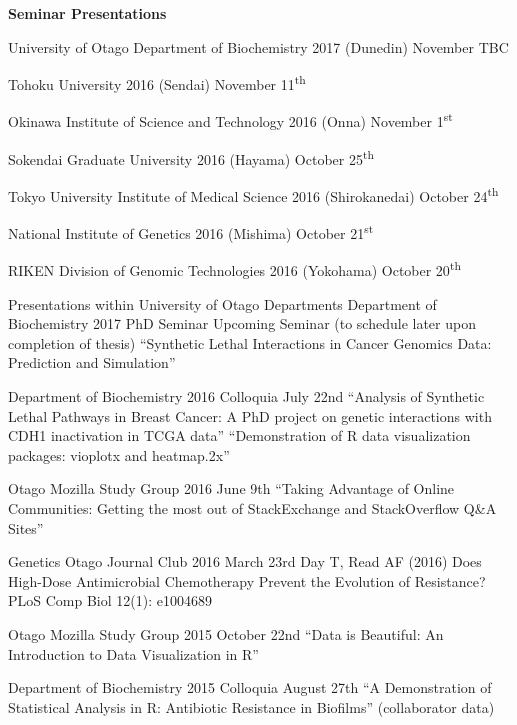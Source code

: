 \clearpage
\textbf{Seminar Presentations}

\begin{small}

University of Otago Department of Biochemistry 2017 (Dunedin) November TBC

Tohoku University 2016 (Sendai) November 11\textsuperscript{th}

Okinawa Institute of Science and Technology 2016 (Onna) November 1\textsuperscript{st}

Sokendai Graduate University 2016 (Hayama) October 25\textsuperscript{th}

Tokyo University Institute of Medical Science 2016 (Shirokanedai) October 24\textsuperscript{th} 

National Institute of Genetics 2016 (Mishima) October 21\textsuperscript{st}

RIKEN Division of Genomic Technologies 2016 (Yokohama) October 20\textsuperscript{th}

\end{small}




\iffalse
Presentations within University of Otago Departments
Department of Biochemistry 2017 PhD Seminar
Upcoming Seminar (to schedule later upon completion of thesis)
``Synthetic Lethal Interactions in Cancer Genomics Data: Prediction and Simulation''

Department of Biochemistry 2016 Colloquia July 22nd
``Analysis of Synthetic Lethal Pathways in Breast Cancer: A PhD project on genetic interactions with CDH1 inactivation in TCGA data''
``Demonstration of R data visualization packages: vioplotx and heatmap.2x''

Otago Mozilla Study Group 2016 June 9th
``Taking Advantage of Online Communities: Getting the most out of StackExchange and StackOverflow Q&A Sites''

Genetics Otago Journal Club 2016 March 23rd 
Day T, Read AF (2016) Does High-Dose Antimicrobial Chemotherapy Prevent the Evolution of Resistance? PLoS Comp Biol 12(1): e1004689

Otago Mozilla Study Group 2015 October 22nd
``Data is Beautiful: An Introduction to Data Visualization in R''

Department of Biochemistry 2015 Colloquia August 27th
``A Demonstration of Statistical Analysis in R: Antibiotic Resistance in Biofilms'' (collaborator data)


